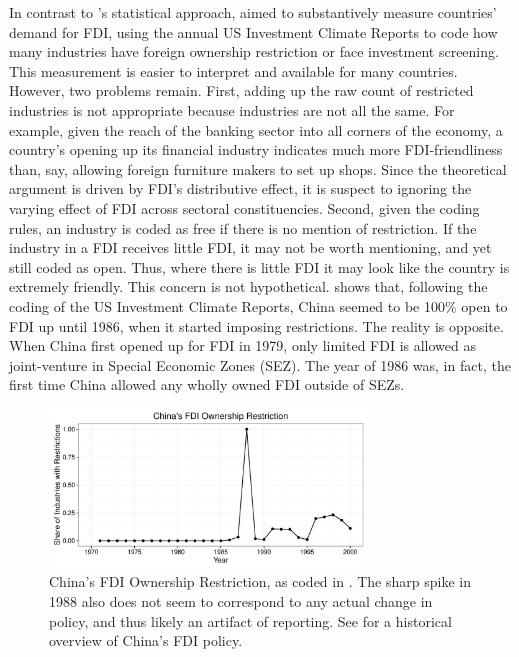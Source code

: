 In contrast to \citet{Pinto2013}'s statistical approach, \citet{Pandya2014, Pandya2016} aimed to substantively measure countries' demand for FDI, using the annual US Investment Climate Reports to code how many industries have foreign ownership restriction or face investment screening. This measurement is easier to interpret and available for many countries. However, two problems remain. First, adding up the raw count of restricted industries is not appropriate because industries are not all the same. For example, given the reach of the banking sector into all corners of the economy, a country's opening up its financial industry indicates much more FDI-friendliness than, say, allowing foreign furniture makers to set up shops. Since the theoretical argument is driven by FDI's distributive effect, it is suspect to ignoring the varying effect of FDI across sectoral constituencies. Second, given the coding rules, an industry is coded as free if there is no mention of restriction. If the industry in a FDI receives little FDI, it may not be worth mentioning, and yet still coded as open. Thus, where there is little FDI it may look like the country is extremely friendly. This concern is not hypothetical.  shows that, following the coding of the US Investment Climate Reports, China seemed to be 100\% open to FDI up until 1986, when it started imposing restrictions. The reality is opposite. When China first opened up for FDI in 1979, only limited FDI is allowed as joint-venture in Special Economic Zones (SEZ). The year of 1986 was, in fact, the first time China allowed any wholly owned FDI outside of SEZs.

\begin{figure}[!ht]
\centering
\includegraphics[width=0.75\textwidth,keepaspectratio]{../figure/china_fdi_restriction}
\caption{China's FDI Ownership Restriction, as coded in \citet{Pandya2010}. The sharp spike in 1988 also does not seem to correspond to any actual change in policy, and thus likely an artifact of reporting. See \citet{Zebregs2002} for a historical overview of China's FDI policy.}
\label{fig:china_fdi_restriction}
\end{figure}

